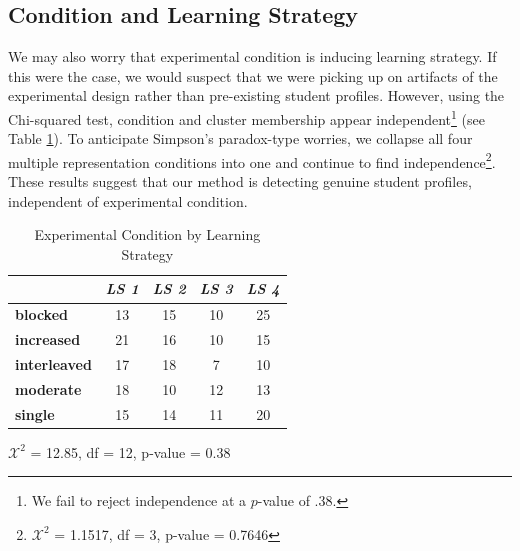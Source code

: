 \documentclass{edm_template}
\begin{document}
\subsection{Condition and Learning Strategy}

We may also worry that experimental condition is inducing learning strategy. If this were the case, we would suspect that we were picking up on artifacts of the experimental design rather than pre-existing student profiles. However, using the Chi-squared test, condition and cluster membership appear independent\footnote{We fail to reject independence at a $p$-value of $.38$.} (see Table \ref{tab:exp-and-LS}). To anticipate Simpson's paradox-type worries, we collapse all four multiple representation conditions into one and continue to find independence\footnote{$\mathcal{X}^{2}$ = 1.1517, df = 3, p-value = 0.7646}. These results suggest that our method is detecting genuine student profiles, independent of experimental condition. 


\begin{table}[hbtp]
\centering

\begin{tabular}{|l || c | c | c | c |}
\hline
&\emph{LS 1}&\emph{LS 2}&\emph{LS 3}&\emph{LS 4}\\ \hline \hline
\textbf{blocked}&     13& 15& 10& 25\\ \hline
\textbf{increased}&   21& 16& 10& 15\\ \hline
\textbf{interleaved}& 17& 18&  7& 10\\ \hline
\textbf{moderate}&    18& 10& 12& 13\\ \hline
\textbf{single}&      15& 14& 11& 20\\ \hline
 \end{tabular}
 
 \begin{center} $\mathcal{X}^2$ = 12.85, df = 12, p-value = 0.38 \end{center}
\caption{Experimental Condition by Learning Strategy}
\label{tab:exp-and-LS}
\end{table}
\end{document}
